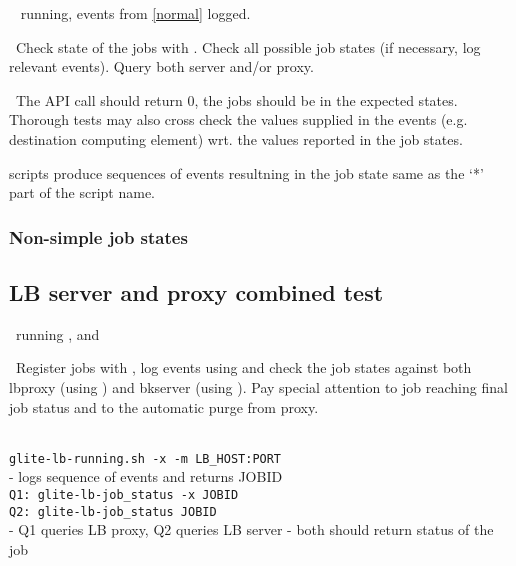 \req\  running, events from \ref{normal} logged.

\what\ Check state of the jobs with . Check all possible job states 
(if necessary, log relevant events). Query both server and/or proxy.

\result\ The API call should return 0, the jobs should be in the expected
states. Thorough tests may also cross check the values supplied in the
events (e.g. destination computing element) wrt. the values reported in the job states.

\begin{hints}
 scripts produce sequences of events resultning
in the job state same as the `*' part of the script name.
\end{hints}



\subsubsection{Non-simple job states}



\subsection{LB server and proxy combined test}

\req\ running ,  and

\what\ Register jobs with , log events
using  and check the job states against
both lbproxy (using ) and bkserver
(using ). Pay special attention to job reaching final 
job status and to the automatic purge from proxy.


\how \\
{\tt glite-lb-running.sh -x -m LB\_HOST:PORT} \\
- logs sequence of events and returns JOBID \\

{\tt Q1: glite-lb-job\_status -x JOBID } \\
{\tt Q2: glite-lb-job\_status JOBID } \\
- Q1 queries LB proxy, Q2 queries LB server - both should return status of the job \\

